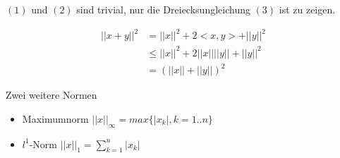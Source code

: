 $(1)$ und $(2)$ sind trivial, nur die Dreiecksungleichung $(3)$ ist zu zeigen.

\begin{align*}
	|| x + y ||^2 &= || x ||^2 + 2<x, y> + || y ||^2 \\
	&\leq || x ||^2 + 2 || x || || y || + || y ||^2 \\
	&= (|| x || + || y ||)^2
\end{align*}

\begin{note}
Zwei weitere Normen
	\begin{itemize}
		\item Maximumnorm $ || x ||_\infty = max \{ |x_k|, k=1..n\} $
		\item $l^1$-Norm  $ || x ||_1 = \sum_{k=1}^n |x_k|$
	\end{itemize}
\end{note}
